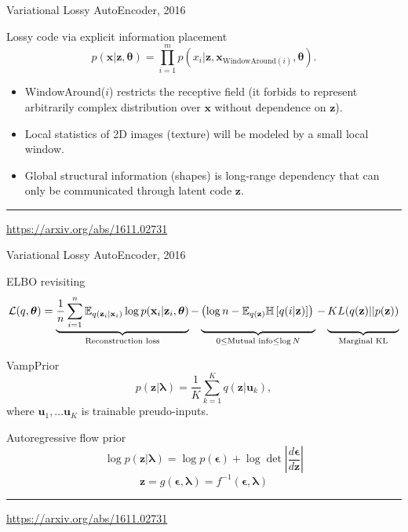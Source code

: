 \documentclass{beamer}
\newcommand{\bu}{\mathbf{u}}
\newcommand{\bx}{\mathbf{x}}
\newcommand{\bz}{\mathbf{z}}
\newcommand{\bepsilon}{\boldsymbol{\epsilon}}
\newcommand{\blambda}{\boldsymbol{\lambda}}
\newcommand{\btheta}{\boldsymbol{\theta}}
\begin{document}
\begin{frame}{Variational Lossy AutoEncoder, 2016}
\begin{block}{Lossy code via explicit information placement}
\[
    p(\bx | \bz, \btheta) = \prod_{i=1}^m p(x_i | \bz, \bx_{\text{WindowAround}(i)}, \btheta).
\]
\begin{itemize}
    \item WindowAround($i$) restricts the receptive field (it forbids to represent arbitrarily complex distribution over $\bx$ without dependence on $\bz$). 
    \item Local statistics of 2D images (texture) will be modeled by a small local window.
    \item Global structural information (shapes) is long-range dependency that can only be communicated through latent code $\bz$. 
\end{itemize}
\end{block}
\vspace{0.7cm}
\vfill
\hrule\medskip
{\scriptsize \href{https://arxiv.org/abs/1611.02731}{https://arxiv.org/abs/1611.02731}}
\end{frame}
\begin{frame}{Variational Lossy AutoEncoder, 2016}
	
	\begin{block}{ELBO revisiting}
		\vspace{-0.3cm}
		{\footnotesize
			\[
			\mathcal{L}(q, \btheta) = \underbrace{\frac{1}{n} \sum_{i=1}^n \mathbb{E}_{q(\bz_i | \bx_i)} \log p(\bx_i | \bz_i, \btheta)}_{\text{Reconstruction loss}} - \underbrace{\left(\log n - \mathbb{E}_{q(\bz)} \mathbb{H} \left[ q(i | \bz) \right] \right)\vphantom{\sum_{i=1}}}_{0 \leq \text{Mutual info} \leq \log N } - \underbrace{KL(q(\bz) || p(\bz))\vphantom{\sum_{i=1}}}_{\text{Marginal KL}}
			\]}
	\end{block}
	\vspace{-0.5cm}
	\begin{block}{VampPrior}
		\vspace{-0.5cm}
		\[
			p(\bz | \blambda) = \frac{1}{K} \sum_{k=1}^K q(\bz | \bu_k),
		\]
	where $\bu_1, \dots \bu_K$ is trainable preudo-inputs.
	\end{block}
	\begin{block}{Autoregressive flow prior}
		\vspace{-0.5cm}
		\[
			\log p(\bz | \blambda) = \log p(\bepsilon) + \log \det \left | \frac{d \bepsilon}{d\bz}\right|
		\]
		\[
			\bz = g(\bepsilon, \blambda) = f^{-1}(\bepsilon, \blambda) 
		\]
	\end{block}
	\vfill
	\hrule\medskip
	{\scriptsize \href{https://arxiv.org/abs/1611.02731}{https://arxiv.org/abs/1611.02731}}
\end{frame}
\end{document}
